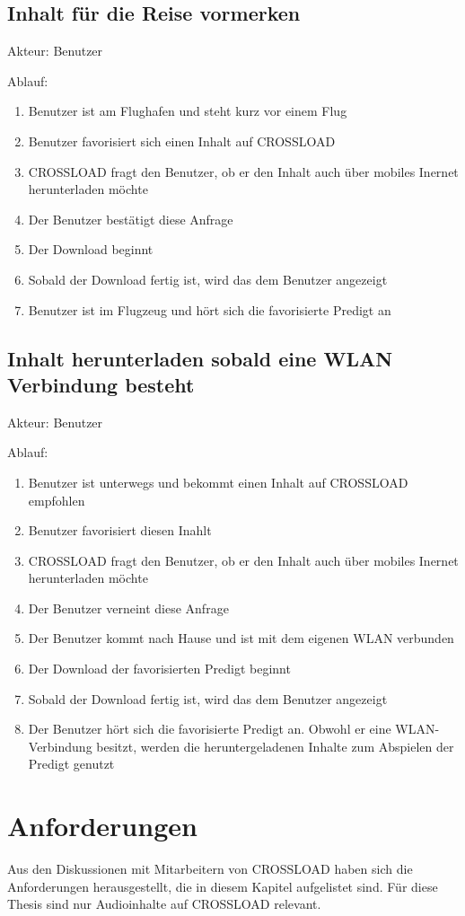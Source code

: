 \subsection{Inhalt für die Reise vormerken}
Akteur: Benutzer

Ablauf:
\begin{enumerate}
	\item Benutzer ist am Flughafen und steht kurz vor einem Flug
	\item Benutzer favorisiert sich einen Inhalt auf CROSSLOAD
	\item CROSSLOAD fragt den Benutzer, ob er den Inhalt auch über mobiles Inernet herunterladen möchte
	\item Der Benutzer bestätigt diese Anfrage
	\item Der Download beginnt
	\item Sobald der Download fertig ist, wird das dem Benutzer angezeigt
	\item Benutzer ist im Flugzeug und hört sich die favorisierte Predigt an
\end{enumerate}

\subsection{Inhalt herunterladen sobald eine WLAN Verbindung besteht}
Akteur: Benutzer

Ablauf:
\begin{enumerate}
	\item Benutzer ist unterwegs und bekommt einen Inhalt auf CROSSLOAD empfohlen
	\item Benutzer favorisiert diesen Inahlt
	\item CROSSLOAD fragt den Benutzer, ob er den Inhalt auch über mobiles Inernet herunterladen möchte
	\item Der Benutzer verneint diese Anfrage
	\item Der Benutzer kommt nach Hause und ist mit dem eigenen WLAN verbunden
	\item Der Download der favorisierten Predigt beginnt
	\item Sobald der Download fertig ist, wird das dem Benutzer angezeigt
	\item Der Benutzer hört sich die favorisierte Predigt an. Obwohl er eine WLAN-Verbindung besitzt, werden die heruntergeladenen Inhalte zum Abspielen der Predigt genutzt
\end{enumerate}

\section{Anforderungen}
Aus den Diskussionen mit Mitarbeitern von CROSSLOAD haben sich die Anforderungen herausgestellt, die in diesem Kapitel aufgelistet sind. Für diese Thesis sind nur Audioinhalte auf CROSSLOAD relevant.

